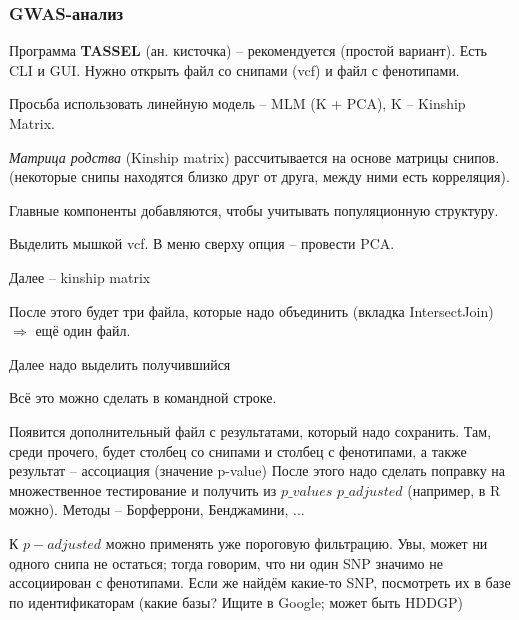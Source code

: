 \documentclass[main.tex]{subfiles}
\begin{document}
\subsubsection{GWAS-анализ}

Программа \textbf{TASSEL} (ан. кисточка) -- рекомендуется (простой вариант).
Есть CLI и GUI.
Нужно открыть файл со снипами (vcf) и файл с фенотипами.

Просьба использовать линейную модель -- MLM (K + PCA), K -- Kinship Matrix.

\emph{Матрица родства} (Kinship matrix) рассчитывается на основе матрицы снипов.
(некоторые снипы находятся близко друг от друга, между ними есть корреляция).

Главные компоненты добавляются, чтобы учитывать популяционную структуру.

\begin{leftbar}
	Выделить мышкой vcf.
	В меню сверху опция -- провести PCA.

	Далее -- kinship matrix

	После этого будет три файла, которые надо объединить (вкладка IntersectJoin) $ \Rightarrow $ ещё один файл.

	Далее надо выделить получившийся
\end{leftbar}
Всё это можно сделать в командной строке.

Появится дополнительный файл с результатами, который надо сохранить.
Там, среди прочего, будет столбец со снипами и столбец с фенотипами, а также результат -- ассоциация (значение p-value)
После этого надо сделать поправку на множественное тестирование и получить из  $ p\_values$ $ p\_adjusted $ (например, в R можно).
Методы -- Борферрони, Бенджамини, ...

К $ p-adjusted $ можно применять уже пороговую фильтрацию.
Увы, может ни одного снипа не остаться; тогда говорим, что ни один SNP значимо не ассоциирован с фенотипами.
Если же найдём какие-то SNP, посмотреть их в базе по идентификаторам (какие базы? Ищите в Google; может быть HDDGP)
\end{document}
